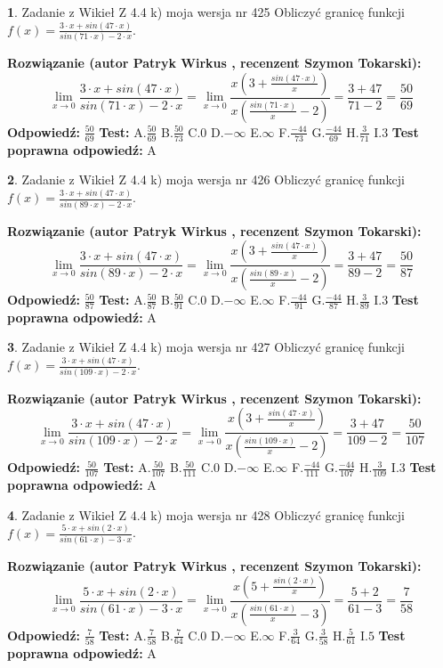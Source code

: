 \documentclass[12pt, a4paper]{article}
\theoremstyle{definition} %
\newtheorem{zad}{}
\newcommand{\zadStart}[1]{\begin{zad}#1\newline}
\newcommand{\zadStop}{\end{zad}}
\newcommand{\rozwStart}[2]{\noindent \textbf{Rozwiązanie (autor #1 , recenzent #2): }\newline}
\newcommand{\rozwStop}{\newline}
\newcommand{\odpStart}{\noindent \textbf{Odpowiedź:}\newline}
\newcommand{\odpStop}{\newline}
\newcommand{\testStart}{\noindent \textbf{Test:}\newline}
\newcommand{\testStop}{\newline}
\newcommand{\kluczStart}{\noindent \textbf{Test poprawna odpowiedź:}\newline}
\newcommand{\kluczStop}{\newline}
\begin{document}
\zadStart{Zadanie z Wikieł Z 4.4 k) moja wersja nr 425}
Obliczyć granicę funkcji $f(x)=\frac{3\cdot x +sin(47\cdot x)}{sin(71\cdot x) -2\cdot x}$.
\zadStop
\rozwStart{Patryk Wirkus}{Szymon Tokarski}
$$\lim\limits_{x\to 0}\frac{3\cdot x +sin(47\cdot x)}{sin(71\cdot x) -2\cdot x}
=\lim\limits_{x\to 0}\frac{x(3+\frac{sin(47\cdot x)}{x})}{x(\frac{sin(71\cdot x)}{x}-2)}
=\frac{3+47}{71-2} = \frac{50}{69}$$
\rozwStop
\odpStart
$\frac{50}{69}$
\odpStop
\testStart
A.$\frac{50}{69}$
B.$\frac{50}{73}$
C.$0$
D.$-\infty$
E.$\infty$
F.$\frac{-44}{73}$
G.$\frac{-44}{69}$
H.$\frac{3}{71}$
I.$3$
\testStop
\kluczStart
A
\kluczStop



\zadStart{Zadanie z Wikieł Z 4.4 k) moja wersja nr 426}
Obliczyć granicę funkcji $f(x)=\frac{3\cdot x +sin(47\cdot x)}{sin(89\cdot x) -2\cdot x}$.
\zadStop
\rozwStart{Patryk Wirkus}{Szymon Tokarski}
$$\lim\limits_{x\to 0}\frac{3\cdot x +sin(47\cdot x)}{sin(89\cdot x) -2\cdot x}
=\lim\limits_{x\to 0}\frac{x(3+\frac{sin(47\cdot x)}{x})}{x(\frac{sin(89\cdot x)}{x}-2)}
=\frac{3+47}{89-2} = \frac{50}{87}$$
\rozwStop
\odpStart
$\frac{50}{87}$
\odpStop
\testStart
A.$\frac{50}{87}$
B.$\frac{50}{91}$
C.$0$
D.$-\infty$
E.$\infty$
F.$\frac{-44}{91}$
G.$\frac{-44}{87}$
H.$\frac{3}{89}$
I.$3$
\testStop
\kluczStart
A
\kluczStop



\zadStart{Zadanie z Wikieł Z 4.4 k) moja wersja nr 427}
Obliczyć granicę funkcji $f(x)=\frac{3\cdot x +sin(47\cdot x)}{sin(109\cdot x) -2\cdot x}$.
\zadStop
\rozwStart{Patryk Wirkus}{Szymon Tokarski}
$$\lim\limits_{x\to 0}\frac{3\cdot x +sin(47\cdot x)}{sin(109\cdot x) -2\cdot x}
=\lim\limits_{x\to 0}\frac{x(3+\frac{sin(47\cdot x)}{x})}{x(\frac{sin(109\cdot x)}{x}-2)}
=\frac{3+47}{109-2} = \frac{50}{107}$$
\rozwStop
\odpStart
$\frac{50}{107}$
\odpStop
\testStart
A.$\frac{50}{107}$
B.$\frac{50}{111}$
C.$0$
D.$-\infty$
E.$\infty$
F.$\frac{-44}{111}$
G.$\frac{-44}{107}$
H.$\frac{3}{109}$
I.$3$
\testStop
\kluczStart
A
\kluczStop



\zadStart{Zadanie z Wikieł Z 4.4 k) moja wersja nr 428}
Obliczyć granicę funkcji $f(x)=\frac{5\cdot x +sin(2\cdot x)}{sin(61\cdot x) -3\cdot x}$.
\zadStop
\rozwStart{Patryk Wirkus}{Szymon Tokarski}
$$\lim\limits_{x\to 0}\frac{5\cdot x +sin(2\cdot x)}{sin(61\cdot x) -3\cdot x}
=\lim\limits_{x\to 0}\frac{x(5+\frac{sin(2\cdot x)}{x})}{x(\frac{sin(61\cdot x)}{x}-3)}
=\frac{5+2}{61-3} = \frac{7}{58}$$
\rozwStop
\odpStart
$\frac{7}{58}$
\odpStop
\testStart
A.$\frac{7}{58}$
B.$\frac{7}{64}$
C.$0$
D.$-\infty$
E.$\infty$
F.$\frac{3}{64}$
G.$\frac{3}{58}$
H.$\frac{5}{61}$
I.$5$
\testStop
\kluczStart
A
\kluczStop
\end{document}
